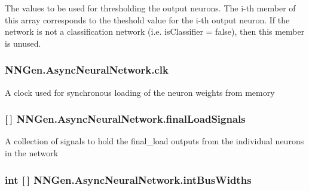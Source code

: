 The values to be used for thresholding the output neurons. The i-\/th member of this array corresponds to the theshold value for the i-\/th output neuron. If the network is not a classification network (i.\+e. is\+Classifier = false), then this member is unused. 

\hypertarget{class_n_n_gen_1_1_async_neural_network_ad3bb38686daf90675f37c81e6b8e749e}{}
\subsubsection[{clk}]{ N\+N\+Gen.\+Async\+Neural\+Network.\+clk\hspace{0.3cm}{\ttfamily [get]}}\label{class_n_n_gen_1_1_async_neural_network_ad3bb38686daf90675f37c81e6b8e749e}


A clock used for synchronous loading of the neuron weights from memory 

\hypertarget{class_n_n_gen_1_1_async_neural_network_a17ce3ebd6db5f93a473bd2b45527c726}{}
\subsubsection[{final\+Load\+Signals}]{ \mbox{[}$\,$\mbox{]} N\+N\+Gen.\+Async\+Neural\+Network.\+final\+Load\+Signals\hspace{0.3cm}{\ttfamily [get]}}\label{class_n_n_gen_1_1_async_neural_network_a17ce3ebd6db5f93a473bd2b45527c726}


A collection of signals to hold the final\+\_\+load outputs from the individual neurons in the network 

\hypertarget{class_n_n_gen_1_1_async_neural_network_a545f2bfc72b27d96c054de93d82a7571}{}
\subsubsection[{int\+Bus\+Widths}]{\setlength{\rightskip}{0pt plus 5cm}int \mbox{[}$\,$\mbox{]} N\+N\+Gen.\+Async\+Neural\+Network.\+int\+Bus\+Widths\hspace{0.3cm}{\ttfamily [get]}}\label{class_n_n_gen_1_1_async_neural_network_a545f2bfc72b27d96c054de93d82a7571}


